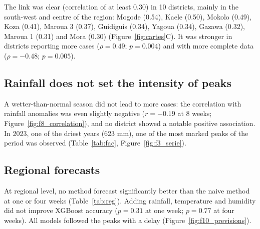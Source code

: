 \documentclass[11pt]{article}
\begin{document}
The link was clear (correlation of at least 0.30) in 10 districts, mainly in the south-west and centre of the region: Mogode (0.54), Kaele (0.50), Mokolo (0.49), Koza (0.41), Maroua 3 (0.37), Guidiguis (0.34), Yagoua (0.34), Gazawa (0.32), Maroua 1 (0.31) and Mora (0.30) (Figure~\ref{fig:cartes}C). It was stronger in districts reporting more cases ($\rho=0.49$; $p=0.004$) and with more complete data ($\rho=-0.48$; $p=0.005$).

\subsection{Rainfall does not set the intensity of peaks}
A wetter-than-normal season did not lead to more cases: the correlation with rainfall anomalies was even slightly negative ($r=-0.19$ at 8 weeks; Figure~\ref{fig:f8_correlation}), and no district showed a notable positive association. In 2023, one of the driest years (623 mm), one of the most marked peaks of the period was observed (Table~\ref{tab:fac}, Figure~\ref{fig:f3_serie}).

\subsection{Regional forecasts}
At regional level, no method forecast significantly better than the naive method at one or four weeks (Table~\ref{tab:reg}). Adding rainfall, temperature and humidity did not improve XGBoost accuracy ($p=0.31$ at one week; $p=0.77$ at four weeks). All models followed the peaks with a delay (Figure~\ref{fig:f10_previsions}).
\end{document}
